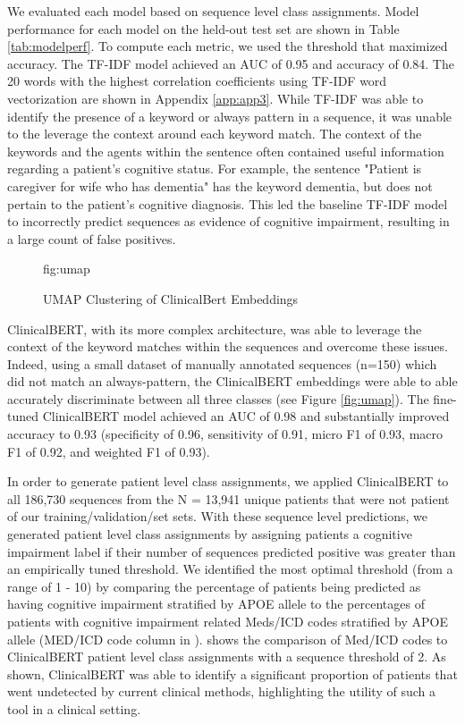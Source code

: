 \documentclass[pmlr,twocolumn,10pt]{jmlr} %
\begin{document}

We evaluated each model based on sequence level class assignments. Model performance for each model on the held-out test set are shown in Table \ref{tab:modelperf}. To compute each metric, we used the threshold that maximized accuracy. The TF-IDF model achieved an AUC of 0.95 and accuracy of 0.84. The 20 words with the highest correlation coefficients using TF-IDF word vectorization are shown in Appendix \ref{app:app3}. While TF-IDF was able to identify the presence of a keyword or always pattern in a sequence, it was unable to the leverage the context around each keyword match. The context of the keywords and the agents within the sentence often contained useful information regarding a patient's cognitive status. For example, the sentence "Patient is caregiver for wife who has dementia" has the keyword dementia, but does not pertain to the patient's cognitive diagnosis. This led the baseline TF-IDF model to incorrectly predict sequences as evidence of cognitive impairment, resulting in a large count of false positives.

\begin{figure}[htb]
\floatconts
{fig:umap}
{\caption{UMAP Clustering of ClinicalBert Embeddings}}
\end{figure}

ClinicalBERT, with its more complex architecture, was able to leverage the context of the keyword matches within the sequences and overcome these issues. Indeed, using a small dataset of manually annotated sequences (n=150) which did not match an always-pattern, the ClinicalBERT embeddings were able to able accurately discriminate between all three classes (see Figure \ref{fig:umap}). The fine-tuned ClinicalBERT model achieved an AUC of 0.98 and substantially improved accuracy to 0.93 (specificity of 0.96, sensitivity of 0.91, micro F1 of 0.93, macro F1 of 0.92, and weighted F1 of 0.93). 

In order to generate patient level class assignments, we applied ClinicalBERT to all 186,730 sequences from the N = 13,941 unique patients that were not patient of our training/validation/set sets. With these sequence level predictions, we generated patient level class assignments by assigning patients a cognitive impairment label if their number of sequences predicted positive was greater than an empirically tuned threshold. We identified the most optimal threshold (from a range of 1 - 10) by comparing the percentage of patients being predicted as having cognitive impairment stratified by APOE allele to the percentages of patients with cognitive impairment related Meds/ICD codes stratified by APOE allele (MED/ICD code column in ).  shows the comparison of Med/ICD codes to ClinicalBERT patient level class assignments with a sequence threshold of 2. As shown, ClinicalBERT was able to identify a significant proportion of patients that went undetected by current clinical methods, highlighting the utility of such a tool in a clinical setting. 
\end{document}
